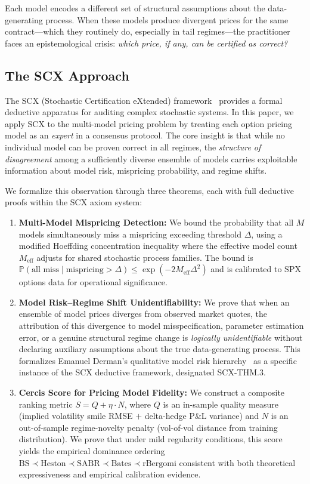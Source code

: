 \documentclass[11pt,a4paper]{article}
\theoremstyle{plain}
\theoremstyle{definition}
\theoremstyle{remark}
\newcommand{\Pbb}{\mathbb{P}}
\newcommand{\SCX}{\textsc{SCX}}
\newcommand{\BS}{\text{BS}}
\newcommand{\Heston}{\text{Heston}}
\newcommand{\SABR}{\text{SABR}}
\newcommand{\BatesM}{\text{Bates}}
\newcommand{\rBergomi}{\text{rBergomi}}
\begin{document}
Each model encodes a different set of structural assumptions about the data-generating process. When these models produce divergent prices for the same contract---which they routinely do, especially in tail regimes---the practitioner faces an epistemological crisis: \emph{which price, if any, can be certified as correct?}

\subsection{The SCX Approach}

The \SCX{} (Stochastic Certification eXtended) framework~\citep{scx2025} provides a formal deductive apparatus for auditing complex stochastic systems. In this paper, we apply \SCX{} to the multi-model pricing problem by treating each option pricing model as an \emph{expert} in a consensus protocol. The core insight is that while no individual model can be proven correct in all regimes, the \emph{structure of disagreement} among a sufficiently diverse ensemble of models carries exploitable information about model risk, mispricing probability, and regime shifts.

We formalize this observation through three theorems, each with full deductive proofs within the \SCX{} axiom system:

\begin{enumerate}[label=\textbf{T\arabic*}, leftmargin=*]
  \item \textbf{Multi-Model Mispricing Detection:} We bound the probability that all $M$ models simultaneously miss a mispricing exceeding threshold $\Delta$, using a modified Hoeffding concentration inequality where the effective model count $M_{\text{eff}}$ adjusts for shared stochastic process families. The bound is $\Pbb(\text{all miss} \mid \text{mispricing} > \Delta) \leq \exp(-2 M_{\text{eff}} \Delta^2)$ and is calibrated to SPX options data for operational significance.

  \item \textbf{Model Risk--Regime Shift Unidentifiability:} We prove that when an ensemble of model prices diverges from observed market quotes, the attribution of this divergence to model misspecification, parameter estimation error, or a genuine structural regime change is \emph{logically unidentifiable} without declaring auxiliary assumptions about the true data-generating process. This formalizes Emanuel Derman's qualitative model risk hierarchy~\citep{derman1996model} as a specific instance of the \SCX{} deductive framework, designated \textsc{SCX-THM.3}.

  \item \textbf{Cercis Score for Pricing Model Fidelity:} We construct a composite ranking metric $S = Q + \eta \cdot N$, where $Q$ is an in-sample quality measure (implied volatility smile RMSE $+$ delta-hedge P\&L variance) and $N$ is an out-of-sample regime-novelty penalty (vol-of-vol distance from training distribution). We prove that under mild regularity conditions, this score yields the empirical dominance ordering $\BS \prec \Heston \prec \SABR \prec \BatesM \prec \rBergomi$ consistent with both theoretical expressiveness and empirical calibration evidence.
\end{enumerate}
\end{document}
